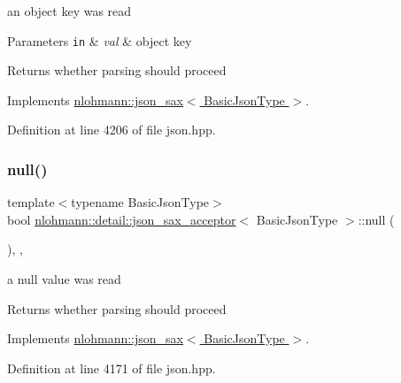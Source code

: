 an object key was read 


\begin{DoxyParams}[1]{Parameters}
\mbox{\tt in}  & {\em val} & object key \\
\hline
\end{DoxyParams}
\begin{DoxyReturn}{Returns}
whether parsing should proceed 
\end{DoxyReturn}


Implements \hyperlink{structnlohmann_1_1json__sax_a2e0c7ecd80b18d18a8cc76f71cfc2028}{nlohmann\+::json\+\_\+sax$<$ Basic\+Json\+Type $>$}.



Definition at line 4206 of file json.\+hpp.

\mbox{\label{classnlohmann_1_1detail_1_1json__sax__acceptor_a173c310b2f829b2c49645af8336c27b8}} 
\subsubsection{\texorpdfstring{null()}{null()}}
{\footnotesize\ttfamily template$<$typename Basic\+Json\+Type$>$ \\
bool \hyperlink{classnlohmann_1_1detail_1_1json__sax__acceptor}{nlohmann\+::detail\+::json\+\_\+sax\+\_\+acceptor}$<$ Basic\+Json\+Type $>$\+::null (\begin{DoxyParamCaption}{ }\end{DoxyParamCaption})\hspace{0.3cm}{\ttfamily [inline]}, {\ttfamily [override]}, {\ttfamily [virtual]}}



a null value was read 

\begin{DoxyReturn}{Returns}
whether parsing should proceed 
\end{DoxyReturn}


Implements \hyperlink{structnlohmann_1_1json__sax_a0ad26edef3f8d530dcec3192bba82df6}{nlohmann\+::json\+\_\+sax$<$ Basic\+Json\+Type $>$}.



Definition at line 4171 of file json.\+hpp.

\mbox{\label{classnlohmann_1_1detail_1_1json__sax__acceptor_a60cf2aa6ba77110a9290e9fc0b5e5873}} 
